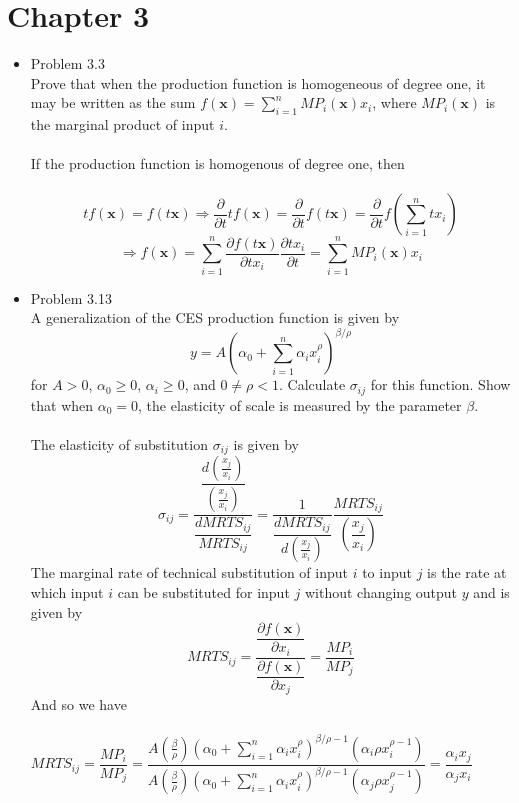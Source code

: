 \documentclass{article}
\begin{document}
\section{Chapter 3}
\begin{itemize}
    \item Problem 3.3\\
    Prove that when the production function is homogeneous of degree one, it may be written as the sum $f(\textbf{x})=\sum_{i=1}^nMP_i(\textbf{x})x_i$, where $MP_i(\textbf{x})$ is the marginal product of input $i$.\\\\
    If the production function is homogenous of degree one, then\\\\
    $$tf(\textbf{x})=f(t\textbf{x})\Rightarrow \dfrac{\partial}{\partial t}tf(\textbf{x})=\dfrac{\partial}{\partial t}f(t\textbf{x})=\dfrac{\partial}{\partial t}f(\sum_{i=1}^ntx_i)$$
    $$\Rightarrow f(\textbf{x})=\sum_{i=1}^n\dfrac{\partial f(t\textbf{x})}{\partial tx_i}\dfrac{\partial tx_i}{\partial t}=\sum_{i=1}^nMP_i(\textbf{x})x_i$$
    \pagebreak
    \item Problem 3.13\\
    A generalization of the CES production function is given by\\
    $$y=A(\alpha_0+\sum_{i=1}^n\alpha_ix_i^\rho)^{\beta/\rho}$$
    for $A>0$, $\alpha_0\geq0$, $\alpha_i\geq0$, and $0\neq\rho<1$.  Calculate $\sigma_{ij}$ for this function.  Show that when $\alpha_0=0$, the elasticity of scale is measured by the parameter $\beta$.\\\\
    The elasticity of substitution $\sigma_{ij}$ is given by\\
    $$\sigma_{ij}=\dfrac{\dfrac{d(\frac{x_j}{x_i})}{(\frac{x_j}{x_i})}}{\dfrac{dMRTS_{ij}}{MRTS_{ij}}}=\dfrac{1}{\dfrac{dMRTS_{ij}}{d(\frac{x_j}{x_i})}}\dfrac{MRTS_{ij}}{(\dfrac{x_j}{x_i})}$$
    The marginal rate of technical substitution of input $i$ to input $j$ is the rate at which input $i$ can be substituted for input $j$ without changing output $y$ and is given by\\
    $$MRTS_{ij}=\dfrac{\dfrac{\partial f(\textbf{x})}{\partial x_i}}{\dfrac{\partial f(\textbf{x})}{\partial x_j}}=\dfrac{MP_i}{MP_j}$$
    And so we have \\\\
    $MRTS_{ij}=\dfrac{MP_i}{MP_j}=\dfrac{A(\frac{\beta}{\rho})(\alpha_0+\sum_{i=1}^n\alpha_ix_i^\rho)^{\beta/\rho-1}(\alpha_i\rho x_i^{\rho-1})}{A(\frac{\beta}{\rho})(\alpha_0+\sum_{i=1}^n\alpha_ix_i^\rho)^{\beta/\rho-1}(\alpha_j\rho x_j^{\rho-1})}=\dfrac{\alpha_ix_j}{\alpha_jx_i}$\\\\

\end{itemize}
\end{document}
